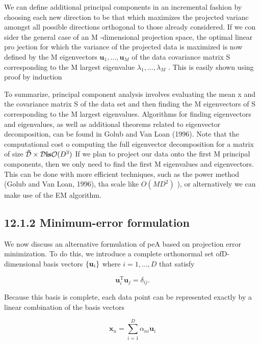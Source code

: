 \documentclass[
  10
]{article}
\begin{document}
We can define additional principal components in an incremental fashion
by choosing each new direction to be that which maximizes the projected
varianc amongst all possible directions orthogonal to those already
considered. If we con sider the general case of an M -dimensional
projection space, the optimal linear pro jection for which the variance
of the projected data is maximized is now defined by the M eigenvectors
\(\mathbf { u } _ { 1 } , \dots , \mathbf { u } _ { M }\) of the data
covariance matrix S corresponding to the M largest eigenvalue
\(\lambda _ { 1 } , \dots , \lambda _ { M }\) . This is easily shown
using proof by induction

To summarize, principal component analysis involves evaluating the mean
x and the covariance matrix S of the data set and then finding the M
eigenvectors of S corresponding to the M largest eigenvalues. Algorithms
for finding eigenvectors and eigenvalues, as well as additional theorems
related to eigenvector decomposition, can be found in Golub and Van Loan
(1996). Note that the computational cost o computing the full
eigenvector decomposition for a matrix of size
\({ \bf \bar { \cal D } } \times { \cal D } { \bf i s } { \cal O } ( D ^ { 3 } )\)
If we plan to project our data onto the first M principal components,
then we only need to find the first M eigenvalues and eigenvectors. This
can be done with more efficient techniques, such as the power method
(Golub and Van Loan, 1996), tha scale like \(O ( M D ^ { 2 } )\) ), or
alternatively we can make use of the EM algorithm.

\subsection{12.1.2 Minimum-error
formulation}\label{minimum-error-formulation}

We now discuss an alternative formulation of peA based on projection
error minimization. To do this, we introduce a complete orthonormal set
ofD-dimensional basis vectors \(\left\{ { \bf { u } } _ { i } \right\}\)
where \(i = 1 , \ldots , D\) that satisfy

\[
\mathbf {u} _ {i} ^ {\mathrm{T}} \mathbf {u} _ {j} = \delta_ {i j}.\tag{12.7}
\]

Because this basis is complete, each data point can be represented
exactly by a linear combination of the basis vectors

\[
\mathbf {x} _ {n} = \sum_ {i = 1} ^ {D} \alpha_ {n i} \mathbf {u} _ {i}\tag{12.8}
\]
\end{document}
